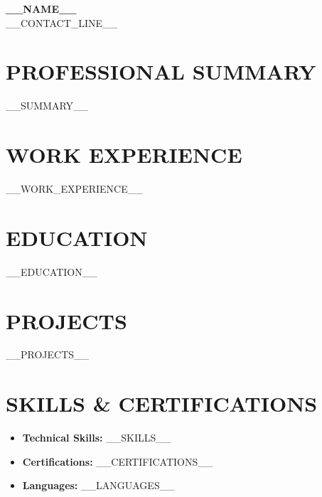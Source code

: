 \documentclass[11pt,a4paper]{article}
\begin{document}
\begin{center}
    {\Huge \bfseries \color{primary} __NAME__} \\[4pt]
    {\color{secondary} \small __CONTACT_LINE__}
\end{center}

\vspace{-4pt}

\section*{PROFESSIONAL SUMMARY}
\color{primary}
__SUMMARY__

\section*{WORK EXPERIENCE}
__WORK_EXPERIENCE__

\section*{EDUCATION}
__EDUCATION__

\section*{PROJECTS}
__PROJECTS__

\section*{SKILLS \& CERTIFICATIONS}
\begin{itemize}[leftmargin=0pt, label={}]
    \item \textbf{Technical Skills:} __SKILLS__
    \item \textbf{Certifications:} __CERTIFICATIONS__
    \item \textbf{Languages:} __LANGUAGES__
\end{itemize}
\end{document}
